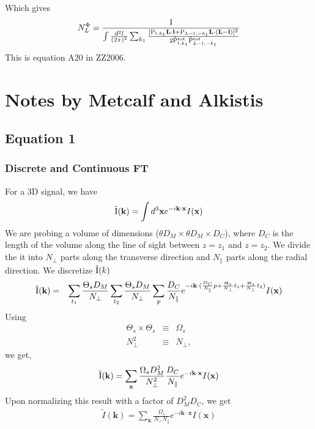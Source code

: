 \documentclass[12pt]{article}
\newcommand{\beq}{\begin{equation}}
\newcommand{\eeq}{\end{equation}}
\newcommand{\beqal}{\begin{aligned}}
\newcommand{\eeqal}{\end{aligned}}
\def\l{{\bf l}}
\def\L{{\bf L}}
\def\il{{\tilde{\rm I}}}
\def\pul{{\rm P}}
\def\ptot{{\tilde{\rm P}^{\rm tot}}}
\numberwithin{equation}{section}
\begin{document}
Which gives
\beq
\beqal
N_L^\Phi = \frac{1}{{\int \frac{d^2 l}{(2\pi)^2} \sum_{k_1} \frac{[\pul_{l,k_1} \L\cdot \l +
			\pul_{L-l,-k_1} \L\cdot (\L-\l)]^2}{2\ptot_{l,k_1}\ptot_{L-l,-k_1}} }}
\eeqal
\eeq
This is equation A20 in ZZ2006.


\section{Notes by Metcalf and Alkistis}
\subsection{Equation 1}
\subsubsection{Discrete and Continuous FT}
For a 3D signal, we have 
\begin{eqnarray}
	\il(\textbf{k}) = \int d^3\textbf{x} e^{-i \textbf{k} \cdot  \textbf{x}} I(\textbf{x})
\end{eqnarray}
We are probing a volume of dimensions ($ \theta D_M \times \theta D_M \times D_C $), where $ D_C $ is the length of the volume along the line of sight between $ z = z_1$ and $z = z_2 $.  We divide the it into $ N_\perp $ parts along the transverse direction and $ N_\parallel $ parts along the radial direction. We discretize $ \il(k) $ 
\begin{eqnarray}
	\il(\textbf {k}) &=& \sum_{t_1} \frac{\Theta_s D_M}{N_\perp} \sum_{t_2} \frac{\Theta_s D_M }{N_\perp} \sum_{p} \frac{D_C}{N_\parallel} e^{-i \textbf {k} \cdot ( \frac{D_C}{N_\parallel}p + \frac{\Theta_s}{N_\perp} t_1 + \frac{\Theta_s}{N_\perp} t_2)} I(\textbf {x}) 
\end{eqnarray}
Using
\begin{eqnarray}
	\Theta_s \times \Theta_s &\equiv & \Omega_s \\
	N_\perp^2 &\equiv& N_\perp, 
\end{eqnarray}
we get,
\begin{eqnarray}
	\il(\textbf{k}) =  \sum_{\textbf {x}} \frac{\Omega_s D_M^2}{N_\perp^2} \frac{ D_C }{N_\parallel} e^{-i \textbf {k} \cdot \textbf {x}} I(\textbf {x})
\end{eqnarray}
Upon normalizing this result with a factor of $ D_M^2 D_C $, we get
\begin{eqnarray}
	\tilde{I}(\textbf{k}) =  \sum_{\textbf {x}} \frac{\Omega_s}{N_\perp N_\parallel} e^{-i \textbf {k} \cdot \textbf {x}} I(\textbf {x})
\end{eqnarray}
\end{document}
